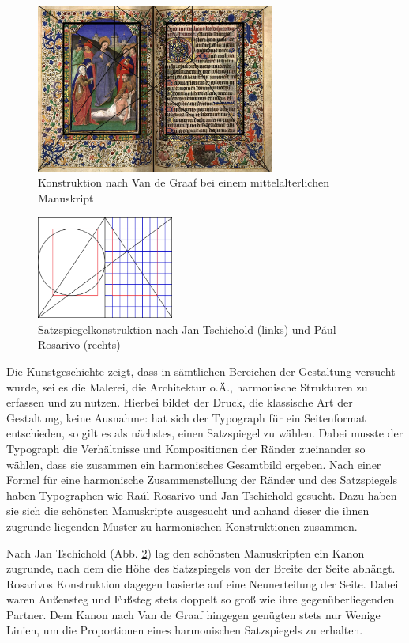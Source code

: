 \documentclass[12pt,a4paper]{article}
\begin{document}
\begin{figure}[htbp]
\centering
\includegraphics[width=0.7\textwidth]{Bilder/oldManus.jpg}
\caption{Konstruktion nach Van de Graaf bei einem mittelalterlichen Manuskript}
\label{fig:oldMan}
\end{figure}
\begin{figure}
\centering
\includegraphics[width=0.4\textwidth]{Bilder/page_construction.png}
\caption{Satzspiegelkonstruktion nach Jan Tschichold (links) und Pául Rosarivo (rechts)}
\label{fig:TschicholdRosarivo}
\end{figure}

Die Kunstgeschichte zeigt, dass in sämtlichen Bereichen der Gestaltung versucht wurde, sei es die Malerei, die Architektur o.Ä., harmonische Strukturen zu erfassen und zu nutzen. Hierbei bildet der Druck, die klassische Art der Gestaltung, keine Ausnahme: hat sich der Typograph für ein Seitenformat entschieden, so gilt es als nächstes, einen Satzspiegel zu wählen. Dabei musste der Typograph die Verhältnisse und Kompositionen der Ränder zueinander so wählen, dass sie zusammen ein harmonisches Gesamtbild ergeben. Nach einer Formel für eine harmonische Zusammenstellung der Ränder und des Satzspiegels haben Typographen wie Raúl Rosarivo und Jan Tschichold gesucht. Dazu haben sie sich die schönsten Manuskripte ausgesucht und anhand dieser die ihnen zugrunde liegenden Muster zu harmonischen Konstruktionen zusammen.

Nach Jan Tschichold (Abb. \ref{fig:TschicholdRosarivo}) lag den schönsten Manuskripten ein Kanon zugrunde, nach dem die Höhe des Satzspiegels von der Breite der Seite abhängt. Rosarivos Konstruktion dagegen basierte auf eine Neunerteilung der Seite. Dabei waren Außensteg und Fußsteg stets doppelt so groß wie ihre gegenüberliegenden Partner. Dem Kanon nach Van de Graaf hingegen genügten stets nur Wenige Linien, um die Proportionen eines harmonischen Satzspiegels zu erhalten.
\end{document}
